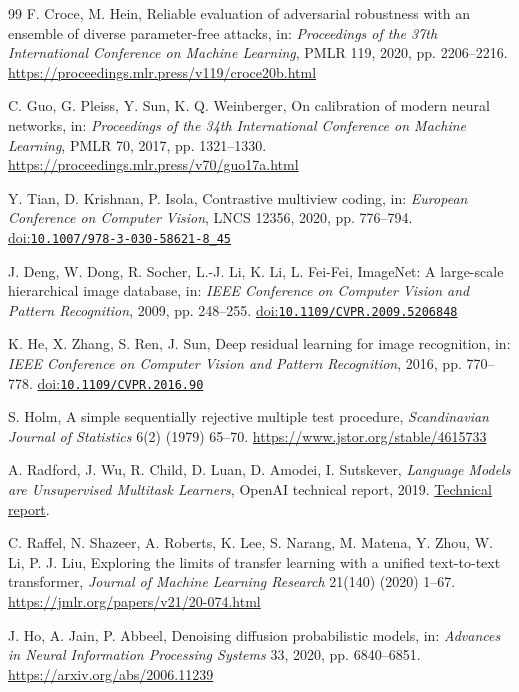 \documentclass[10pt,a4paper,twocolumn]{article}
\providecommand{\doi}[1]{%
  \href{https://doi.org/#1}{doi:\nolinkurl{#1}}}
\begin{document}
\begin{thebibliography}{99}
F. Croce, M. Hein,
Reliable evaluation of adversarial robustness with an ensemble
of diverse parameter-free attacks,
in: \emph{Proceedings of the 37th International Conference
on Machine Learning}, PMLR 119, 2020, pp. 2206--2216.
\url{https://proceedings.mlr.press/v119/croce20b.html}

C. Guo, G. Pleiss, Y. Sun, K. Q. Weinberger,
On calibration of modern neural networks,
in: \emph{Proceedings of the 34th International Conference
on Machine Learning}, PMLR 70, 2017, pp. 1321--1330.
\url{https://proceedings.mlr.press/v70/guo17a.html}

Y. Tian, D. Krishnan, P. Isola,
Contrastive multiview coding,
in: \emph{European Conference on Computer Vision},
LNCS 12356, 2020, pp. 776--794.
\doi{10.1007/978-3-030-58621-8_45}

J. Deng, W. Dong, R. Socher, L.-J. Li, K. Li, L. Fei-Fei,
ImageNet: A large-scale hierarchical image database,
in: \emph{IEEE Conference on Computer Vision and Pattern Recognition},
2009, pp. 248--255.
\doi{10.1109/CVPR.2009.5206848}

K. He, X. Zhang, S. Ren, J. Sun,
Deep residual learning for image recognition,
in: \emph{IEEE Conference on Computer Vision and Pattern Recognition},
2016, pp. 770--778.
\doi{10.1109/CVPR.2016.90}

S. Holm,
A simple sequentially rejective multiple test procedure,
\emph{Scandinavian Journal of Statistics}
6(2) (1979) 65--70.
\url{https://www.jstor.org/stable/4615733}

A. Radford, J. Wu, R. Child, D. Luan, D. Amodei, I. Sutskever,
\emph{Language Models are Unsupervised Multitask Learners},
OpenAI technical report, 2019.
\href{https://cdn.openai.com/better-language-models/language_models_are_unsupervised_multitask_learners.pdf}
{Technical report}.

C. Raffel, N. Shazeer, A. Roberts, K. Lee, S. Narang,
M. Matena, Y. Zhou, W. Li, P. J. Liu,
Exploring the limits of transfer learning with a
unified text-to-text transformer,
\emph{Journal of Machine Learning Research}
21(140) (2020) 1--67.
\url{https://jmlr.org/papers/v21/20-074.html}

J. Ho, A. Jain, P. Abbeel,
Denoising diffusion probabilistic models,
in: \emph{Advances in Neural Information Processing Systems}
33, 2020, pp. 6840--6851.
\url{https://arxiv.org/abs/2006.11239}


\end{thebibliography}
\end{document}

